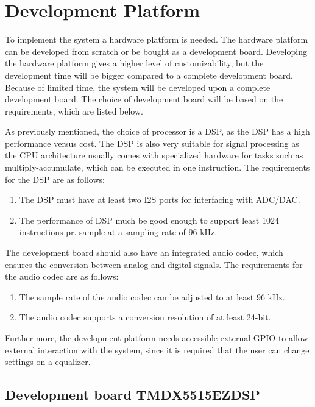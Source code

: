 \chapter{Development Platform}

To implement the system a hardware platform is needed. The hardware platform can be developed from scratch or be bought as a development board. Developing the hardware platform gives a higher level of customizability, but the development time will be bigger compared to a complete development board. Because of limited time, the system will be developed upon a complete development board. The choice of development board will be based on the requirements, which are listed below.

As previously mentioned, the choice of processor is a DSP, as the DSP has a high performance versus cost. The DSP is also very suitable for signal processing as the CPU architecture usually comes with specialized hardware for tasks such as multiply-accumulate, which can be executed in one instruction. The requirements for the DSP are as follows:

\begin{enumerate}
\item The DSP must have at least two \gls{I2S} ports for interfacing with ADC/DAC.
\item The performance of DSP much be good enough to support least 1024 instructions pr. sample at a sampling rate of 96 kHz.
\end{enumerate}

The development board should also have an integrated audio codec, which ensures the conversion between analog and digital signals. The requirements for the audio codec are as follows:

\begin{enumerate}
\item The sample rate of the audio codec can be adjusted to at least 96 kHz.
\item The audio codec supports a conversion resolution of at least 24-bit.
\end{enumerate}

Further more, the development platform needs accessible external GPIO to allow external interaction with the system, since it is required that the user can change settings on a equalizer. 


\section{Development board TMDX5515EZDSP}

